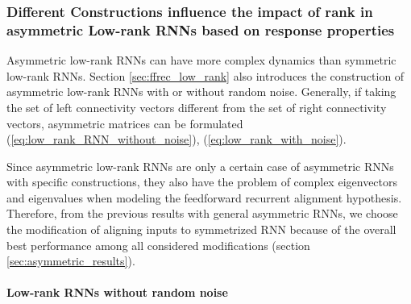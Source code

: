 \documentclass[11pt]{article}
\begin{document}
	\subsubsection{Different Constructions influence the impact of rank in asymmetric Low-rank RNNs based on response properties}
	
	Asymmetric low-rank RNNs can have more complex dynamics than symmetric low-rank RNNs. Section \ref{sec:ffrec_low_rank} also introduces the construction of asymmetric low-rank RNNs with or without random noise. Generally, if taking the set of left connectivity vectors different from the set of right connectivity vectors, asymmetric matrices can be formulated (\ref{eq:low_rank_RNN_without_noise}), (\ref{eq:low_rank_with_noise}). 
	
	Since asymmetric low-rank RNNs are only a certain case of asymmetric RNNs with specific constructions, they also have the problem of complex eigenvectors and eigenvalues when modeling the feedforward recurrent alignment hypothesis. Therefore, from the previous results with general asymmetric RNNs, we choose the modification of aligning inputs to symmetrized RNN because of the overall best performance among all considered modifications (section \ref{sec:asymmetric_results}).
	
	\paragraph{Low-rank RNNs without random noise}
	
\end{document}
